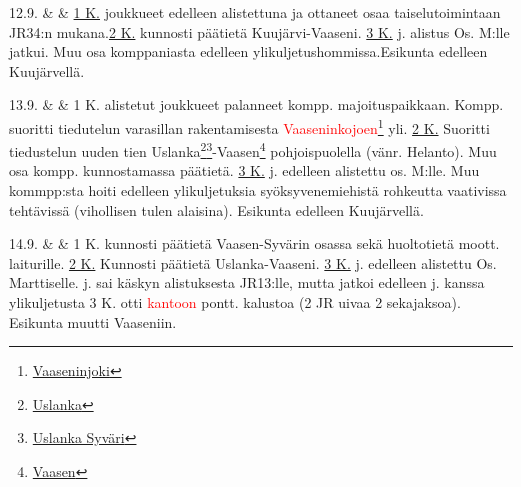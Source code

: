 \documentclass[11pt,a5paper,oneside]{book}
\begin{document}
\newpage

12.9. & & \underline{1 K.} joukkueet edelleen alistettuna ja ottaneet osaa taiselutoimintaan JR34:n mukana.\newline\newline \underline{2 K.} kunnosti päätietä Kuujärvi-Vaaseni. \newline\newline \underline{3 K.}  j. alistus Os. M:lle jatkui. Muu osa komppaniasta edelleen ylikuljetushommissa.\newline\newline Esikunta edelleen Kuujärvellä. \\

\taulustop


13.9. & & 1 K. alistetut joukkueet palanneet kompp. majoituspaikkaan. Kompp. suoritti tiedutelun varasillan rakentamisesta \textcolor{red}{Vaaseninkojoen}\footnote{\href{https://www.google.fi/maps/place/Reka+Vazhinka/@60.9717912,34.0093844,5359m/}{Vaaseninjoki}} yli. \newline\newline \underline{2 K.} Suoritti tiedustelun uuden tien Uslanka\footnote{\href{https://www.google.fi/maps/place/6\%C2\%B058'32.7\%22N+33\%C2\%B054'02.8\%22E/@60.976793,33.8997559,17z/}{Uslanka}}\footnote{\href{https://www.sotahistoriallisetkohteet.fi/app/sights/view/-/id/994/country/9/area/85/}{Uslanka Syväri}}-Vaasen\footnote{\href{https://www.google.fi/maps/place/Vaaseni,+Leningradin+alue,+Ven\%C3\%A4j\%C3\%A4,+187742/@60.9621216,34.0129134,15z/}{Vaasen}} pohjoispuolella (vänr. Helanto). Muu osa kompp. kunnostamassa päätietä. \newline\newline \underline{3 K.}  j. edelleen alistettu os. M:lle. Muu kommpp:sta hoiti edelleen ylikuljetuksia syöksyvenemiehistä rohkeutta vaativissa tehtävissä (vihollisen tulen alaisina).  \newline\newline Esikunta edelleen Kuujärvellä. \\

\newpage

14.9. & & 1 K. kunnosti päätietä Vaasen-Syvärin osassa sekä huoltotietä moott. laiturille. \newline\newline \underline{2 K.} Kunnosti päätietä Uslanka-Vaaseni. \newline\newline \underline{3 K.}  j. edelleen alistettu Os. Marttiselle.  j. sai käskyn alistuksesta JR13:lle, mutta jatkoi edelleen  j. kanssa ylikuljetusta 3 K. otti \textcolor{red}{kantoon} pontt. kalustoa (2 JR uivaa 2 sekajaksoa). Esikunta muutti Vaaseniin. \\
\end{document}
